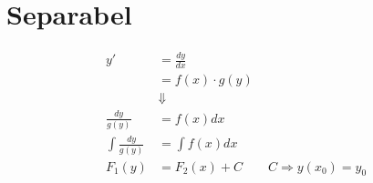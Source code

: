 \section{Separabel}
\begin{align*}
y' &= \frac{d y}{d x} \\
&= f(x)\cdot g(y)\\
&\Downarrow\\
\frac{d y}{g(y)} &= f(x)d x\\
\int{\frac{d y}{g(y)}} &= \int{f(x)d x}\\
F_{1}(y) &= F_{2}(x)+C \qquad C\Rightarrow y(x_{0}) = y_{0}
\end{align*}